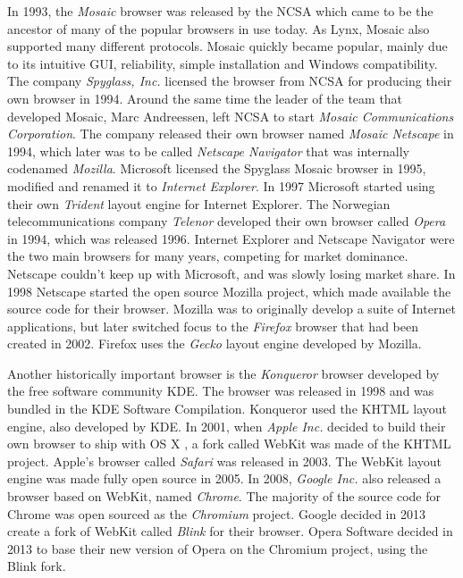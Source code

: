 \documentclass[a4paper,11pt]{kth-mag}
\newcommand\abbr[2][]{\uppercase{#2}\ifthenelse{\equal{#1}{}}%
                     {}{#1}}
\begin{document}
        In 1993, the \emph{Mosaic} \gls{browser} was released by the \gls{NCSA} which came to be the ancestor of many of the popular \glspl{browser} in use today.
        As Lynx, Mosaic also supported many different protocols.
        Mosaic quickly became popular, mainly due to its intuitive \gls{GUI}, reliability, simple installation and Windows compatibility.
        The company \emph{Spyglass, Inc.} licensed the \gls{browser} from \gls{NCSA} for producing their own \gls{browser} in 1994.
        Around the same time the leader of the team that developed Mosaic, Marc Andreessen, left \gls{NCSA} to start \emph{Mosaic Communications Corporation}.
        The company released their own \gls{browser} named \emph{Mosaic Netscape} in 1994, which later was to be called \emph{Netscape Navigator} that was internally codenamed \emph{Mozilla}.
        Microsoft licensed the Spyglass Mosaic \gls{browser} in 1995, modified and renamed it to \emph{Internet Explorer}.
        In 1997 Microsoft started using their own \emph{Trident} \gls{layout engine} for Internet Explorer.
        The Norwegian telecommunications company \emph{Telenor} developed their own \gls{browser} called \emph{Opera} in 1994, which was released 1996.
        Internet Explorer and Netscape Navigator were the two main \glspl{browser} for many years, competing for market dominance.
        Netscape couldn't keep up with Microsoft, and was slowly losing market share.
        In 1998 Netscape started the open source Mozilla project, which made available the source code for their \gls{browser}.
        Mozilla was to originally develop a suite of Internet applications, but later switched focus to the \emph{Firefox} \gls{browser} that had been created in 2002.
        Firefox uses the \emph{Gecko} \gls{layout engine} developed by Mozilla.

        Another historically important \gls{browser} is the \emph{Konqueror} \gls{browser} developed by the free software community \gls{KDE}.
        The \gls{browser} was released in 1998 and was bundled in the \gls{KDE} Software Compilation.
        Konqueror used the \abbr{khtml} \gls{layout engine}, also developed by \gls{KDE}.
        In 2001, when \emph{Apple Inc.} decided to build their own \gls{browser} to ship with \abbr{os x}, a \gls{fork} called \gls{WebKit} was made of the \abbr{khtml} project.
        Apple's \gls{browser} called \emph{Safari} was released in 2003.
        The \gls{WebKit} \gls{layout engine} was made fully open source in 2005.
        In 2008, \emph{Google Inc.} also released a \gls{browser} based on \gls{WebKit}, named \emph{Chrome}.
        The majority of the source code for Chrome was open sourced as the \emph{Chromium} project.
        Google decided in 2013 create a \gls{fork} of \gls{WebKit} called \emph{Blink} for their \gls{browser}.
        Opera Software decided in 2013 to base their new version of Opera on the Chromium project, using the Blink \gls{fork}.
\end{document}
